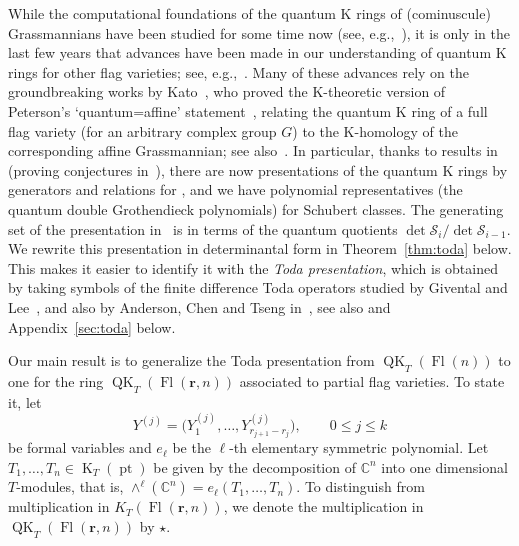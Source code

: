 \documentclass[pdftex]{sigma}
\numberwithin{equation}{section}
\theoremstyle{definition}
\DeclareMathOperator{\Fl}{Fl}
\DeclareMathOperator{\QK}{QK}
\DeclareMathOperator{\K}{K}
\DeclareMathOperator{\pt}{pt}
\newcommand{\bfr}{{\mathbf r}}
\newcommand{\C}{{\mathbb C}}
\newcommand{\cS}{{\mathcal S}}
\begin{document}
While the computational foundations of the quantum K rings
of (cominuscule) Grassmannians have been studied for some
time now (see, e.g.,~\cite{BCMP:qkpos,BCMP:qkchev,buch.m:qk,chaput.perrin:rationality,Gorbounov:2014,sinha2024quantum}),
it is only in the last few years that advances have been made in our understanding of quantum K rings for other
flag varieties; see, e.g.,~\cite{anderson2022finite,gu2023quantum,huq2024quantum,kouno.et.al:parabolic,kouno.naito:C,lenart.naito.sagaki:semiinfinite,maeno.naito.sagaki:QKideal,maeno2023presentation}. Many of these advances rely on the groundbreaking
works by
Kato~\cite{kato2019quantum, kato:loop},
who proved the
K-theoretic
version of Peterson's `quantum=affine' statement~\mbox{\cite{IIM:peterson, li.lam.mihalcea.shimozono:qkaffine}}, relating
the quantum K ring of a full flag variety (for an arbitrary complex group $G$) to the
K-homology of the corresponding affine Grassmannian; see also~\cite{chow2022quantum}.
In particular, thanks to results in~\cite{maeno.naito.sagaki:QKideal,maeno2023presentation}
(proving conjectures in~\cite{lenart.maeno:quantum}),
there are now presentations of the quantum K rings by generators and relations
for \smash{$\QK_T(\Fl(n))$}, and we have polynomial representatives (the quantum double Grothendieck polynomials) for Schubert classes.
The generating set of the presentation in~\cite{maeno.naito.sagaki:QKideal}
is in terms of the quantum quotients $\det \cS_{i} / \det \cS_{i-1}$.
We rewrite this presentation in determinantal form
in Theorem~\ref{thm:toda} below. This makes it easier to identify
it with the {\em Toda presentation},
which is obtained by taking symbols of the finite difference
Toda operators studied by Givental and Lee~\cite{givental_lee},
and also by Anderson, Chen and Tseng in~\cite{act:2017}, see also
\cite{koroteev} and Appendix~\ref{sec:toda} below.

Our main result is to generalize the Toda presentation from $\QK_T(\Fl(n))$
to one for the ring
$\QK_T(\Fl(\bfr,n))$ associated to partial flag varieties. To state it, let
\[
Y^{(j)}=\bigl(Y^{(j)}_1,\dots,{ Y^{(j)}_{r_{j+1}-r_j}}\bigr), \qquad 0\leq j\leq k
\]
be formal variables and $e_\ell$ be the $\ell$-th elementary symmetric polynomial. Let $T_1,\dots, T_n \in \K_T(\pt)$ be given by
the decomposition of $\C^n$ into one dimensional $T$-modules, that is, $\wedge^\ell(\C^n)=e_\ell(T_1,\dots,T_n)$. To distinguish from multiplication in $K_T(\Fl(\bfr,n))$, we denote the multiplication in $\QK_T(\Fl(\bfr,n))$ by $\star$.
\end{document}
